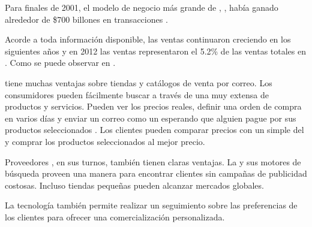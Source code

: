 		Para finales de 2001, el modelo de negocio más grande de \ecommerceCOM, \btob, había ganado alrededor de \$700 billones en transacciones \cite{clark2011american}.

		

		Acorde a toda información disponible, las ventas \ecommerceCOM continuaron creciendo en los siguientes años y en 2012 las ventas \ecommerceCOM representaron el 5.2\% de las ventas totales en \usaNAME. Como se puede observar en .

		\ecommerceCOM tiene muchas ventajas sobre tiendas \brickandmortar y catálogos de venta por correo. Los consumidores pueden fácilmente buscar a través de una \dataBasesDB muy extensa de productos y servicios. Pueden ver los precios reales, definir una orden de compra en varios días y enviar un correo como un \wishlist esperando que alguien pague por sus productos seleccionados \cite{online_whishList_important}. Los clientes pueden comparar precios con un simple \click del \mousePC y comprar los productos seleccionados al mejor precio.

		Proveedores \online, en sus turnos, también tienen claras ventajas. La \webINT y sus motores de búsqueda proveen una manera para encontrar clientes sin campañas de publicidad costosas. Incluso tiendas \online pequeñas pueden alcanzar mercados globales. 

		La tecnología \webINT también permite realizar un seguimiento sobre las preferencias de los clientes para ofrecer una comercialización personalizada.

